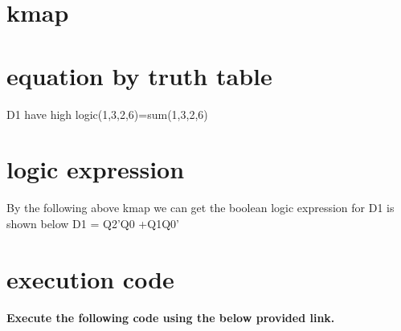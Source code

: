 \documentclass[10pt, a4paper]{article}
\begin{document}
\section{kmap}
\begin{table}[ht]
\caption{kmap}
\end{table}

\section{equation by truth table}
     
D1 have high logic(1,3,2,6)=sum(1,3,2,6)


\section{logic expression} 
By the following above kmap we can get the boolean logic expression for D1 is shown below
     D1 = Q2'Q0 +Q1Q0'
     
\section{execution code}
\textbf{Execute the following code using the below provided link.}\\
\begin{center}
\end{center}
\end{document}
